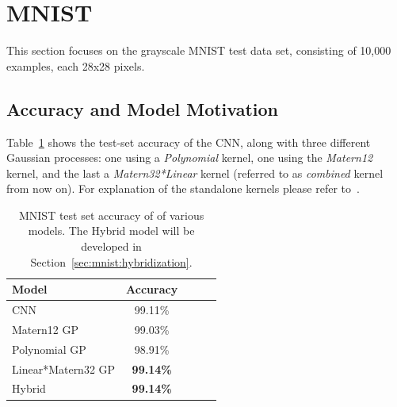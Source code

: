 \documentclass{article}
\begin{document}





\section{MNIST}
\label{sec:mnist}
This section focuses on the grayscale MNIST test data set, consisting of 10,000 examples, each 28x28 pixels.

\subsection{Accuracy and Model Motivation}
\label{sec:mnist:acc}

Table~\ref{tab:model_accuracies} shows the test-set accuracy of the CNN, along with three different Gaussian processes: one using a \textit{Polynomial} kernel, one using the \textit{Matern12} kernel, and the last a \textit{Matern32*Linear} kernel (referred to as \textit{combined} kernel from now on). For explanation of the standalone kernels please refer to~\citet{rasmussen2006gaussian}.


\begin{table}[htb]
\caption{MNIST test set accuracy of of various models. The Hybrid model will be developed in Section~\ref{sec:mnist:hybridization}.}
\vskip 0.15in
\begin{center}
\begin{small}
\begin{sc}
\begin{tabular}{lcccr}
\toprule
Model 				& Accuracy \\
\midrule
CNN    				& 99.11\%  \\
Matern12 GP	 		& 99.03\%  \\
Polynomial GP    	& 98.91\%  \\
Linear*Matern32 GP	& \textbf{99.14\%}  \\
Hybrid    			& \textbf{99.14\%}  \\
\bottomrule
\end{tabular}
\end{sc}
\end{small}
\end{center}
\vskip -0.1in
\label{tab:model_accuracies}
\end{table}
\end{document}
